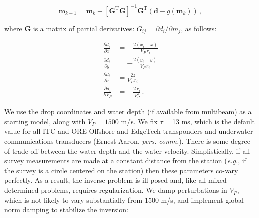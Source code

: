\documentclass[10pt,titlepage]{article}
\begin{document}
\begin{equation}
	\mathbf{m}_{k+1} = \mathbf{m}_k + \left[\mathbf{G}^{\text{T}} \mathbf{G}\right]^{-1} \mathbf{G}^{\text{T}} \left(\mathbf{d} - g(\mathbf{m}_k)\right) \,,
\end{equation}

where $\mathbf{G}$ is a matrix of partial derivatives: $G_{ij} = \partial d_i/\partial m_j$, as follows:

\begin{align}
\frac{\partial d_i}{\partial x} &= 
	-\frac{2 (x_i - x)}{V_P \, r_i}\\
\frac{\partial d_i}{\partial y} &= 
	-\frac{2 (y_i - y)}{V_P \, r_i} \\
\frac{\partial d_i}{\partial z} &= 
	\frac{2 z}{V_P \, r_i} \\	
\frac{\partial d_i}{\partial V_P} &= 
	-\frac{2 \, r_i}{V_P^2} \,.
\end{align}

We use the drop coordinates and water depth (if available from multibeam) as a starting model, along with $V_P = 1500$ m/s. We fix $\tau =$13 ms, which is the default value for all ITC and ORE Offshore and EdgeTech transponders and underwater communications transducers (Ernest Aaron, \textit{pers. comm.}). There is some degree of trade-off between the water depth and the water velocity. Simplistically, if all survey measurements are made at a constant distance from the station (\textit{e.g.}, if the survey is a circle centered on the station) then these parameters co-vary perfectly. As a result, the inverse problem is ill-posed and, like all mixed-determined problems, requires regularization. We damp perturbations in $V_P$, which is not likely to vary substantially from 1500 m/s, and implement global norm damping to stabilize the inversion:
\end{document}
